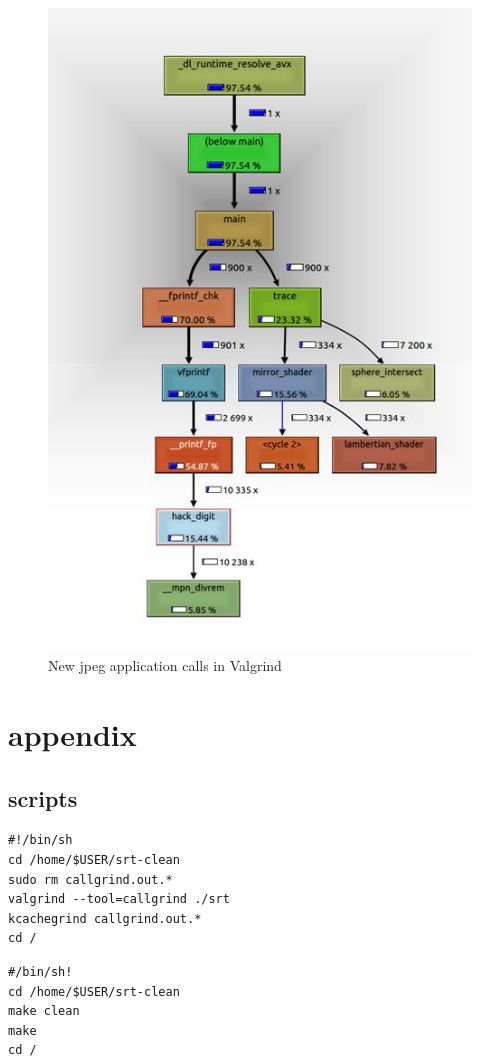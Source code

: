 \documentclass[journal]{IEEEtran}
\begin{document}
\begin{figure}[!h]
	\centering
	\includegraphics[width=.8\linewidth]{valgrind2}
	\caption{New jpeg application calls in Valgrind}
	\label{fig:valgrind2}
\end{figure}


\section{appendix}
\subsection{scripts}
\begin{lstlisting}
#!/bin/sh
cd /home/$USER/srt-clean
sudo rm callgrind.out.*
valgrind --tool=callgrind ./srt
kcachegrind callgrind.out.*
cd /
\end{lstlisting}

\begin{lstlisting}
#/bin/sh!
cd /home/$USER/srt-clean
make clean
make
cd /
\end{lstlisting}
\end{document}
